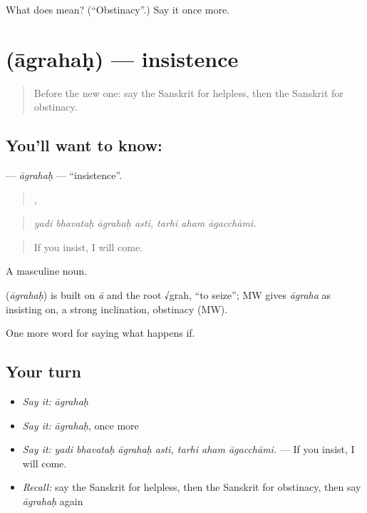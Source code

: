 \begin{tcolorbox}[breakable,colback=teal!4,colframe=teal!35!black,title={Before you move on}]
What does  mean? (\textquotedblleft{}Obstinacy\textquotedblright{}.) Say it once more.
\end{tcolorbox}
\section[\texorpdfstring{\sk{आग्रहः} (āgrahaḥ)}{आग्रहः (āgrahaḥ)}]{ (āgrahaḥ) — insistence}

\label{lesson:SA-C543-agrahah}



\begin{quote}
Before the new one: say the Sanskrit for helpless, then the Sanskrit for obstinacy.
\end{quote}

\subsection*{You'll want to know: }
\textbf{} — \emph{āgrahaḥ} — \textquotedblleft{}insistence\textquotedblright{}.

\begin{quote}
   ,   
\end{quote}

\begin{quote}
\emph{yadi bhavataḥ āgrahaḥ asti, tarhi aham āgacchāmi.}
\end{quote}

\begin{quote}
If you insist, I will come.
\end{quote}

A masculine noun.

\begin{cousinweb}
\textbf{} (\emph{āgrahaḥ}) is built on \emph{ā} and the root √grah, \textquotedblleft{}to seize\textquotedblright{}; MW gives \emph{āgraha} as insisting on, a strong inclination, obstinacy (MW).
\end{cousinweb}

\begin{grammarlens}[title={What you've built}]
One more word for saying what happens if.
\end{grammarlens}

\subsection*{Your turn}
\begin{itemize}
\raggedright
  \item \emph{Say it:} \emph{āgrahaḥ}
  \item \emph{Say it:} \emph{āgrahaḥ}, once more
  \item \emph{Say it:} \emph{yadi bhavataḥ āgrahaḥ asti, tarhi aham āgacchāmi.} — If you insist, I will come.
  \item \emph{Recall:} say the Sanskrit for helpless, then the Sanskrit for obstinacy, then say \emph{āgrahaḥ} again
\end{itemize}

